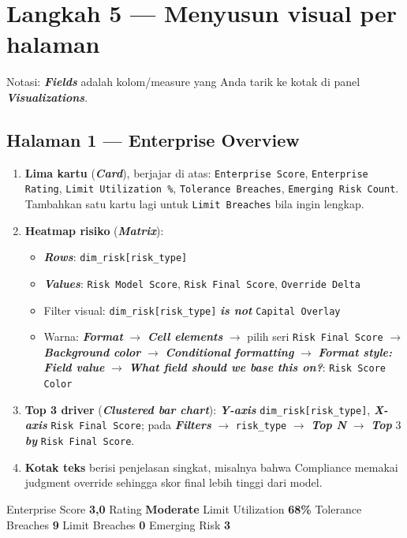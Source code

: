 \documentclass[11pt,a4paper]{article}
\newcommand{\file}[1]{\texttt{\small #1}}
\newcommand{\ui}[1]{\textbf{\textit{#1}}}
\begin{document}
\section{Langkah 5 --- Menyusun visual per halaman}

Notasi: \ui{Fields} adalah kolom/measure yang Anda tarik ke kotak di panel \ui{Visualizations}.

\subsection{Halaman 1 --- Enterprise Overview}

\begin{enumerate}
\item \textbf{Lima kartu} (\ui{Card}), berjajar di atas: \file{Enterprise Score}, \file{Enterprise Rating}, \file{Limit Utilization \%}, \file{Tolerance Breaches}, \file{Emerging Risk Count}. Tambahkan satu kartu lagi untuk \file{Limit Breaches} bila ingin lengkap.
\item \textbf{Heatmap risiko} (\ui{Matrix}):
  \begin{itemize}
  \item \ui{Rows}: \file{dim\_risk[risk\_type]}
  \item \ui{Values}: \file{Risk Model Score}, \file{Risk Final Score}, \file{Override Delta}
  \item Filter visual: \file{dim\_risk[risk\_type]} \ui{is not} \texttt{Capital Overlay}
  \item Warna: \ui{Format} $\rightarrow$ \ui{Cell elements} $\rightarrow$ pilih seri \file{Risk Final Score} $\rightarrow$ \ui{Background color} $\rightarrow$ \ui{Conditional formatting} $\rightarrow$ \ui{Format style: Field value} $\rightarrow$ \ui{What field should we base this on?}: \file{Risk Score Color}
  \end{itemize}
\item \textbf{Top 3 driver} (\ui{Clustered bar chart}): \ui{Y-axis} \file{dim\_risk[risk\_type]}, \ui{X-axis} \file{Risk Final Score}; pada \ui{Filters} $\rightarrow$ \file{risk\_type} $\rightarrow$ \ui{Top N} $\rightarrow$ \ui{Top} 3 \ui{by} \file{Risk Final Score}.
\item \textbf{Kotak teks} berisi penjelasan singkat, misalnya bahwa Compliance memakai judgment override sehingga skor final lebih tinggi dari model.
\end{enumerate}

\begin{tipbox}
Enterprise Score \textbf{3{,}0} \textbullet{} Rating \textbf{Moderate} \textbullet{} Limit Utilization \textbf{68\%} \textbullet{} Tolerance Breaches \textbf{9} \textbullet{} Limit Breaches \textbf{0} \textbullet{} Emerging Risk \textbf{3}
\end{tipbox}
\end{document}
